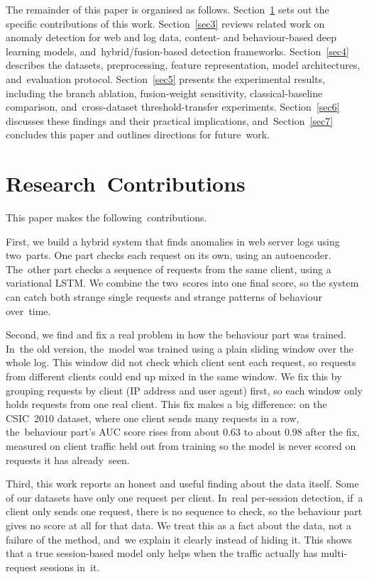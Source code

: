 \documentclass[futureinternet,article,accept,moreauthors]{Definitions/mdpi}
\begin{document}
The remainder of this paper is organised as follows. Section~\ref{sec2} sets out the specific contributions of this work. Section~\ref{sec3} reviews related work on anomaly detection for web and log data, content- and behaviour-based deep learning models, and~hybrid/fusion-based detection frameworks. Section~\ref{sec4} describes the datasets, preprocessing, feature representation, model architectures, and~evaluation protocol. Section~\ref{sec5} presents the experimental results, including the branch ablation, fusion-weight sensitivity, classical-baseline comparison, and~cross-dataset threshold-transfer experiments. Section~\ref{sec6} discusses these findings and their practical implications, and~Section~\ref{sec7} concludes this paper and outlines directions for future~work.

\section{Research~Contributions} \label{sec2}

This paper makes the following~contributions.

First, we build a hybrid system that finds anomalies in web server logs using \mbox{two parts}. One part checks each request on its own, using an autoencoder. The~other part checks a sequence of requests from the same client, using a variational LSTM. We combine the \mbox{two scores} into one final score, so the system can catch both strange single requests and strange patterns of behaviour over~time.

Second, we find and fix a real problem in how the behaviour part was trained. In~the old version, the~model was trained using a plain sliding window over the whole log. This window did not check which client sent each request, so requests from different clients could end up mixed in the same window. We fix this by grouping requests by client (IP address and user agent) first, so each window only holds requests from one real client. This fix makes a big difference: on the CSIC~2010 dataset, where one client sends many requests in a row, the~behaviour part's AUC score rises from about 0.63 to about 0.98 after the fix, measured on client traffic held out from training so the model is never scored on requests it has already~seen.

Third, this work reports an honest and useful finding about the data itself. Some of our datasets have only one request per client. In~real per-session detection, if~a client only sends one request, there is no sequence to check, so the behaviour part gives no score at all for that data. We treat this as a fact about the data, not a failure of the method, and~we explain it clearly instead of hiding it. This shows that a true session-based model only helps when the traffic actually has multi-request sessions in~it.
\end{document}
